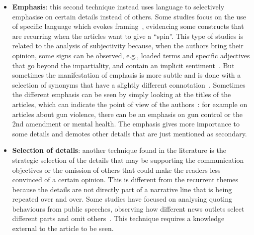 \begin{itemize}
    \item \textbf{Emphasis}: this second technique instead uses language to selectively emphasise on certain details instead of others.
    Some studies focus on the use of specific language which evokes framing~\cite{baumer2015testing}, evidencing some constructs that are recurring when the articles want to give a ``spin''.
    This type of studies is related to the analysis of subjectivity because, when the authors bring their opinion, some signs can be observed, e.g., loaded terms and specific adjectives that go beyond the impartiality, and contain an implicit sentiment~\cite{greene2009more}.
    But sometimes the manifestation of emphasis is more subtle and is done with a selection of synonyms that have a slightly different connotation~\cite{schuldt2011global,rugg1941experiments,tversky1981framing}.
    Sometimes the different emphasis can be seen by simply looking at the titles of the articles, which can indicate the point of
    view of the authors~\cite{liu2019detecting}: for example on articles about gun violence, there can be an emphasis on gun control or the 2nd amendment or mental health.
    The emphasis gives more importance to some details and demotes other details that are just mentioned as secondary.
    
    
    \item \textbf{Selection of details}: another technique found in the literature is the strategic selection of the details that may be supporting the communication objectives or the omission of others that could make the readers less convinced of a certain opinion. This is different from the recurrent themes because the details are not directly part of a narrative line that is being repeated over and over.
    Some studies have focused on analysing quoting behaviours from public speeches, observing how different news outlets select different parts and omit others~\cite{niculae2015quotus}.
    This technique requires a knowledge external to the article to be seen.


\end{itemize}
